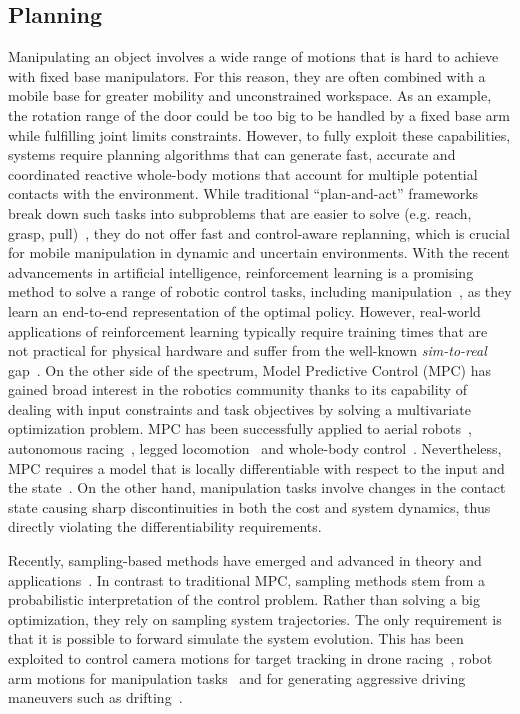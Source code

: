 \subsection{Planning}
Manipulating an object involves a wide range of motions that is hard to achieve with fixed base manipulators. For this reason, they are often combined with a mobile base for greater mobility and unconstrained workspace. As an example, the rotation range of the door could be too big to be handled by a fixed base arm while fulfilling joint limits constraints. However, to fully exploit these capabilities, systems require planning algorithms that can generate fast, accurate and coordinated reactive whole-body motions that account for multiple potential contacts with the environment. While traditional ``plan-and-act'' frameworks break down such tasks into subproblems that are easier to solve (e.g. reach, grasp, pull)~\cite{Murali2020}, they do not offer fast and control-aware replanning, which is crucial for mobile manipulation  in dynamic and uncertain environments. 
With the recent advancements in artificial intelligence, reinforcement learning is a promising method to solve a range of robotic control tasks, including manipulation~\cite{finn2016deep}, as they learn an end-to-end representation of the optimal policy. However, real-world applications of reinforcement learning typically require training times that are not practical for physical hardware and suffer from the well-known \emph{sim-to-real} gap~\cite{chebotar2019closing}. 
On the other side of the spectrum, Model Predictive Control (MPC) has gained broad interest in the robotics community thanks to its capability of dealing with input constraints and task objectives by solving a multivariate optimization problem. 
MPC has been successfully applied to aerial robots~\cite{brunner2020trajectory}, autonomous racing~\cite{liniger2015optimization}, legged locomotion~\cite{grandia2019frequency} and whole-body control~\cite{minniti2019whole}. Nevertheless, MPC requires a model that is locally differentiable with respect to the input and the state~\cite{buchli2017optimal}. On the other hand, manipulation tasks involve changes in the contact state causing sharp discontinuities in both the cost and system dynamics, thus directly violating the differentiability requirements. 

Recently, sampling-based methods have emerged and advanced in theory and applications~\cite{lee_aggressive_2020,abraham_model-based_2020,rajamaki_augmenting_2017}. 
In contrast to traditional MPC, sampling methods stem from a probabilistic interpretation of the control problem. 
Rather than solving a big optimization, they rely on sampling system trajectories. The only requirement is that it is possible to forward simulate the system evolution. This has been exploited to control camera motions for target tracking in drone racing~\cite{lee_aggressive_2020}, robot arm motions for manipulation tasks~\cite{abraham_model-based_2020} and for generating aggressive driving maneuvers such as drifting~\cite{williams_information_2017}. 

